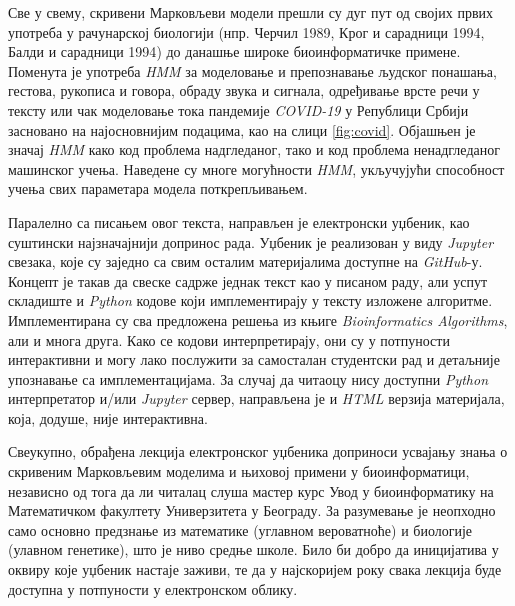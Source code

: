 \documentclass[12pt,oneside]{memoir}
\begin{document}
\begin{CJK}{UTF8}{ipxm}
Све у свему, скривени Марковљеви модели прешли су дуг пут од својих првих употреба у рачунарској биологији (нпр. Черчил 1989\cite{churchill1989}, Крог и сарадници 1994\cite{krogh1994}, Балди и сарадници 1994\cite{baldi1994}) до данашње широке биоинформатичке примене. Поменута је употреба \textit{HMM} за моделовање и препознавање људског понашања, гестова, рукописа и говора, обраду звука и сигнала, одређивање врсте речи у тексту или чак моделовање тока пандемије \textit{COVID-19} у Републици Србији засновано на најосновнијим подацима, као на слици \ref{fig:covid}. Објашњен је значај \textit{HMM} како код проблема надгледаног, тако и код проблема ненадгледаног машинског учења. Наведене су многе могућности \textit{HMM}, укључујући способност учења свих параметара модела поткрепљивањем.

Паралелно са писањем овог текста, направљен је електронски уџбеник, као суштински најзначајнији допринос рада. Уџбеник је реализован у виду \textit{Jupyter} свезака, које су заједно са свим осталим материјалима доступне на \textit{GitHub}-у\cite{vasovich2021}. Концепт је такав да свеске садрже једнак текст као у писаном раду, али успут складиште и \textit{Python} кодове који имплементирају у тексту изложене алгоритме. Имплементирана су сва предложена решења из књиге \textit{Bioinformatics Algorithms}, али и многа друга. Како се кодови интерпретирају, они су у потпуности интерактивни и могу лако послужити за самосталан студентски рад и детаљније упознавање са имплементацијама. За случај да читаоцу нису доступни \textit{Python} интерпретатор и/или \textit{Jupyter} сервер, направљена је и \textit{HTML} верзија материјала, која, додуше, није интерактивна.

Свеукупно, обрађена лекција електронског уџбеника доприноси усвајању знања о скривеним Марковљевим моделима и њиховој примени у биоинформатици, независно од тога да ли читалац слуша мастер курс Увод у биоинформатику на Математичком факултету Универзитета у Београду. За разумевање је неопходно само основно предзнање из математике (углавном вероватноће) и биологије (улавном генетике), што је ниво средње школе. Било би добро да иницијатива у оквиру које уџбеник настаје заживи, те да у најскоријем року свака лекција буде доступна у потпуности у електронском облику.

\literatura

\end{CJK}
\end{document}
